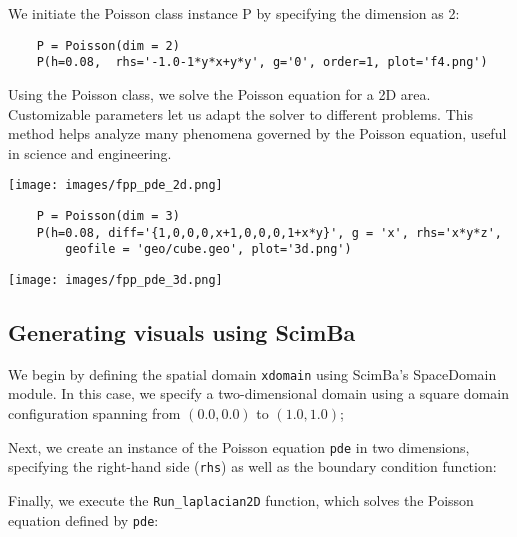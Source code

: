 \documentclass[12pt]{article}
\begin{document}
 We initiate the Poisson class instance P by specifying the dimension as 2:
\begin{lstlisting}
    P = Poisson(dim = 2)
    P(h=0.08,  rhs='-1.0-1*y*x+y*y', g='0', order=1, plot='f4.png')
\end{lstlisting}

Using the Poisson class, we solve the Poisson equation for a 2D area. Customizable parameters let us adapt the solver to different problems. This method helps analyze many phenomena governed by the Poisson equation, useful in science and engineering.

\begin{frame}{}
    \begin{center}
\texttt{[image: images/fpp\_pde\_2d.png]}
    \end{center}
\end{frame}


\begin{lstlisting}
    P = Poisson(dim = 3)
    P(h=0.08, diff='{1,0,0,0,x+1,0,0,0,1+x*y}', g = 'x', rhs='x*y*z', 
        geofile = 'geo/cube.geo', plot='3d.png')

\end{lstlisting}


\begin{frame}{}
    \begin{center}
        \texttt{[image: images/fpp\_pde\_3d.png]}
    \end{center}
\end{frame}    

\newpage

\subsection{Generating visuals using ScimBa}

We begin by defining the spatial domain \texttt{xdomain} using ScimBa's SpaceDomain module. In this case, we specify a two-dimensional domain using a square domain configuration spanning from $(0.0, 0.0)$ to $(1.0, 1.0)$;


Next, we create an instance of the Poisson equation \texttt{pde} in two dimensions, specifying the right-hand side (\texttt{rhs}) as well as the boundary condition function:

Finally, we execute the \texttt{Run\_laplacian2D} function, which solves the Poisson equation defined by \texttt{pde}:
\end{document}
